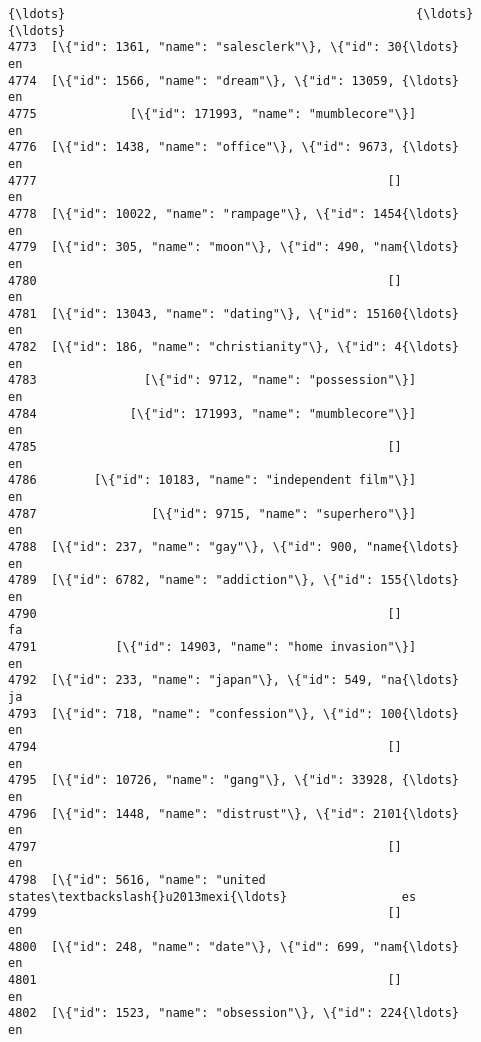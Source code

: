 \documentclass[11pt]{article}
\begin{document}
\begin{Verbatim}[commandchars=\\\{\}]
{\ldots}                                                 {\ldots}               {\ldots}   
4773  [\{"id": 1361, "name": "salesclerk"\}, \{"id": 30{\ldots}                en   
4774  [\{"id": 1566, "name": "dream"\}, \{"id": 13059, {\ldots}                en   
4775             [\{"id": 171993, "name": "mumblecore"\}]                en   
4776  [\{"id": 1438, "name": "office"\}, \{"id": 9673, {\ldots}                en   
4777                                                 []                en   
4778  [\{"id": 10022, "name": "rampage"\}, \{"id": 1454{\ldots}                en   
4779  [\{"id": 305, "name": "moon"\}, \{"id": 490, "nam{\ldots}                en   
4780                                                 []                en   
4781  [\{"id": 13043, "name": "dating"\}, \{"id": 15160{\ldots}                en   
4782  [\{"id": 186, "name": "christianity"\}, \{"id": 4{\ldots}                en   
4783               [\{"id": 9712, "name": "possession"\}]                en   
4784             [\{"id": 171993, "name": "mumblecore"\}]                en   
4785                                                 []                en   
4786        [\{"id": 10183, "name": "independent film"\}]                en   
4787                [\{"id": 9715, "name": "superhero"\}]                en   
4788  [\{"id": 237, "name": "gay"\}, \{"id": 900, "name{\ldots}                en   
4789  [\{"id": 6782, "name": "addiction"\}, \{"id": 155{\ldots}                en   
4790                                                 []                fa   
4791           [\{"id": 14903, "name": "home invasion"\}]                en   
4792  [\{"id": 233, "name": "japan"\}, \{"id": 549, "na{\ldots}                ja   
4793  [\{"id": 718, "name": "confession"\}, \{"id": 100{\ldots}                en   
4794                                                 []                en   
4795  [\{"id": 10726, "name": "gang"\}, \{"id": 33928, {\ldots}                en   
4796  [\{"id": 1448, "name": "distrust"\}, \{"id": 2101{\ldots}                en   
4797                                                 []                en   
4798  [\{"id": 5616, "name": "united states\textbackslash{}u2013mexi{\ldots}                es   
4799                                                 []                en   
4800  [\{"id": 248, "name": "date"\}, \{"id": 699, "nam{\ldots}                en   
4801                                                 []                en   
4802  [\{"id": 1523, "name": "obsession"\}, \{"id": 224{\ldots}                en   


\end{Verbatim}
\end{document}
